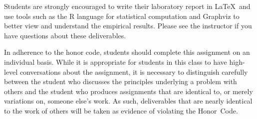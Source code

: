Students are strongly encouraged to write their laboratory report in \LaTeX~and use tools such as the R language for statistical
computation and Graphviz to better view and understand the empirical results. Please see the instructor if you have questions
about these deliverables.

In adherence to the honor code, students should complete this assignment on an individual basis. While it is appropriate for
students in this class to have high-level conversations about the assignment, it is necessary to distinguish carefully between the
student who discusses the principles underlying a problem with others and the student who produces assignments that are identical
to, or merely variations on, someone else's work.  As such, deliverables that are nearly identical to the work of others will be
taken as evidence of violating the \mbox{Honor Code}.  



  
